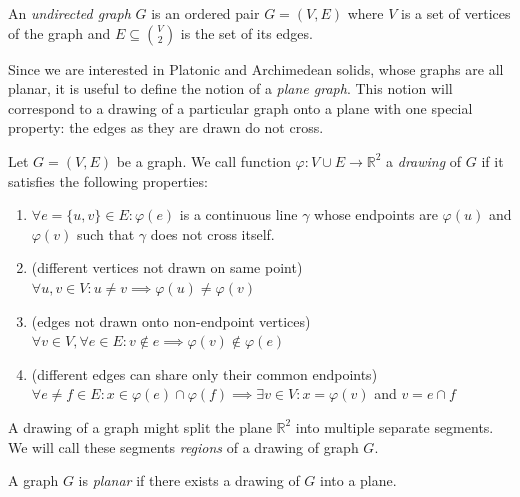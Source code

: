 \begin{definition}
    An \textit{undirected graph} $G$ is an ordered pair $G=(V,E)$ where $V$ is a set of vertices of the graph and $E \subseteq \binom{V}{2}$ is the set of its edges. 
\end{definition}

Since we are interested in Platonic and Archimedean solids, whose graphs are all planar, it is useful to define the notion of a \textit{plane graph}. This notion will correspond to a drawing of a particular graph onto a plane with one special property: the edges as they are drawn do not cross.

\begin{definition}
    Let $G=(V,E)$ be a graph. We call function $\varphi : V \cup E \rightarrow \mathbb{R}^2$ a \textit{drawing} of $G$ if it satisfies the following properties:
    \begin{enumerate}
    
        \item $\forall e=\{u,v\} \in E : \varphi(e)$ is a continuous line $\gamma$ whose endpoints are $\varphi(u)$ and $\varphi(v)$ such that $\gamma$ does not cross itself.
        
        \item (different vertices not drawn on same point) \\ $\forall u,v \in V : u \neq v \implies \varphi(u) \neq \varphi(v)$
        
        \item (edges not drawn onto non-endpoint vertices) \\ $\forall v \in V, \forall e \in E: v \notin e \implies \varphi(v) \notin \varphi(e)$
        
        \item (different edges can share only their common endpoints) \\ $\forall e \neq f \in E : x \in \varphi(e) \cap \varphi(f) \implies \exists v \in V: x = \varphi(v)$ and $v = e \cap f$
    \end{enumerate}
\end{definition}

A drawing of a graph might split the plane $\mathbb{R}^2$ into multiple separate segments. We will call these segments \textit{regions} of a drawing of graph $G$.

\begin{definition}
    A graph $G$ is \textit{planar} if there exists a drawing of $G$ into a plane.
\end{definition}

